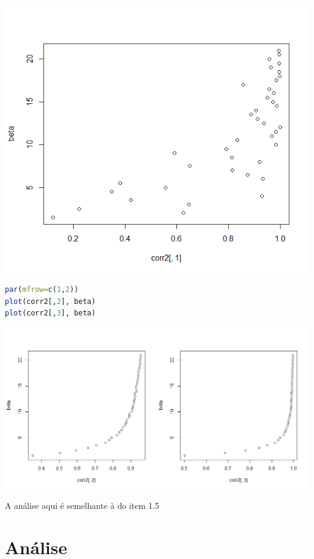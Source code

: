 \documentclass[12pt]{article}
\begin{document}
\begin{center}
	\includegraphics*[scale=0.8]{7.png}
\end{center}

\begin{lstlisting}[language=R]
par(mfrow=c(1,2))
plot(corr2[,2], beta)
plot(corr2[,3], beta)
\end{lstlisting}

\begin{center}
	\includegraphics*[scale=0.6]{8.png}
\end{center}

A análise aqui é semelhante à do item 1.5
\section*{Análise}
\end{document}
